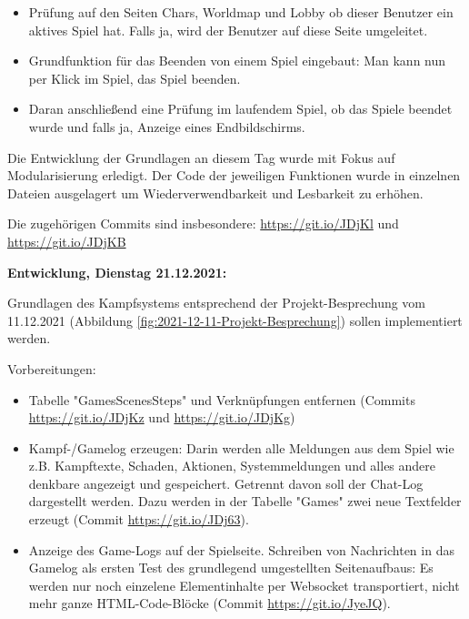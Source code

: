 {            \begin{itemize}
                \item Prüfung auf den Seiten Chars, Worldmap und Lobby ob dieser Benutzer ein aktives Spiel hat. Falls ja, wird der Benutzer auf diese Seite umgeleitet.
                \item Grundfunktion für das Beenden von einem Spiel eingebaut: Man kann nun per Klick im Spiel, das Spiel beenden.
                \item Daran anschließend eine Prüfung im laufendem Spiel, ob das Spiele beendet wurde und falls ja, Anzeige eines Endbildschirms.
            \end{itemize}

            Die Entwicklung der Grundlagen an diesem Tag wurde mit Fokus auf Modularisierung erledigt. Der Code der jeweiligen Funktionen wurde in einzelnen Dateien ausgelagert um Wiederverwendbarkeit und Lesbarkeit zu erhöhen. 

            Die zugehörigen Commits sind insbesondere: 
            \url{https://git.io/JDjKl} und 
            \url{https://git.io/JDjKB}


            \textbf{Entwicklung, Dienstag 21.12.2021:}

            Grundlagen des Kampfsystems entsprechend der Projekt-Besprechung vom 11.12.2021 (Abbildung \ref{fig:2021-12-11-Projekt-Besprechung}) sollen implementiert werden.

            Vorbereitungen: 

            \begin{itemize}
                \item Tabelle "GamesScenesSteps" und Verknüpfungen entfernen (Commits \url{https://git.io/JDjKz} und \url{https://git.io/JDjKg})
                \item Kampf-/Gamelog erzeugen: Darin werden alle Meldungen aus dem Spiel wie z.B. Kampftexte, Schaden, Aktionen, Systemmeldungen und alles andere denkbare angezeigt und gespeichert. Getrennt davon soll der Chat-Log dargestellt werden. Dazu werden in der Tabelle "Games" zwei neue Textfelder erzeugt (Commit \url{https://git.io/JDj63}). 
                \item Anzeige des Game-Logs auf der Spielseite. Schreiben von Nachrichten in das Gamelog als ersten Test des grundlegend umgestellten Seitenaufbaus: Es werden nur noch einzelene Elementinhalte per Websocket transportiert, nicht mehr ganze HTML-Code-Blöcke (Commit \url{https://git.io/JyeJQ}).
            \end{itemize}


}
